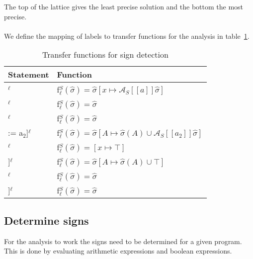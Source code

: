 \noindent The top of the lattice gives the least precise solution and the bottom the most precise.
\\\\
We define the mapping of labels to transfer functions for the analysis in table~\ref{table:sign_detection_functions}.
\begin{table}[h]
\begin{tabular}{| l | l |}
  \hline
  Statement & Function \\
  \hline
  \hline
  [x := a]$^\ell$ & f$_\ell^S (\widehat{\sigma}) = \widehat{\sigma}[x \mapsto \mathcal{A}_S[\![a]\!] \widehat{\sigma} ]$ \\
  \hline
 [skip]$^\ell$ & f$_\ell^S (\widehat{\sigma}) = \widehat{\sigma}$\\
  \hline
 [b]$^\ell$ & f$_\ell^S (\widehat{\sigma}) = \widehat{\sigma}$\\
  \hline
  [A[a$_1$] := a$_2$]$^\ell$ & f$_\ell^S (\widehat{\sigma}) = \widehat{\sigma}[A\mapsto \widehat{\sigma}(A)\cup \mathcal{A}_S[\![a_2]\!] \widehat{\sigma}]$\\
  \hline
  [read x]$^\ell$ & f$_\ell^S (\widehat{\sigma}) = [x \mapsto \top]$ \\
  \hline
  [read A[a]]$^\ell$ & f$_\ell^S (\widehat{\sigma}) =  \widehat{\sigma}[A\mapsto \widehat{\sigma}(A)\cup \top]$\\
  \hline
  [write x]$^\ell$ & f$_\ell^S (\widehat{\sigma}) = \widehat{\sigma}$\\
  \hline
  [write A[n]]$^\ell$ & f$_\ell^S (\widehat{\sigma}) = \widehat{\sigma}$\\
  \hline
\end{tabular}
\centering
\caption{Transfer functions for sign detection}
\label{table:sign_detection_functions}
\end{table}

\subsection{Determine signs}
For the analysis to work the signs need to be determined for a given program. This is done by evaluating arithmetic expressions and boolean expressions.

